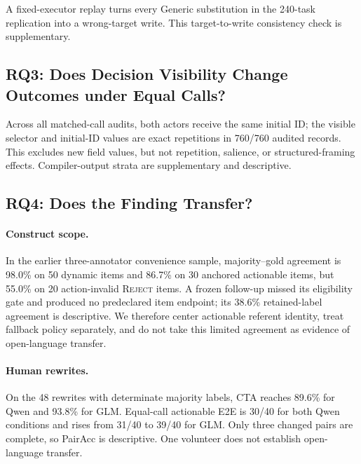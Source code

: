 \documentclass[letterpaper]{article}
\begin{document}
A fixed-executor replay turns every Generic substitution in the 240-task replication into a
wrong-target write. This target-to-write consistency check is supplementary.

\subsection{RQ3: Does Decision Visibility Change Outcomes under Equal Calls?}
%

Across all matched-call audits, both actors receive the same initial ID; the visible selector and
initial-ID values are exact repetitions in 760/760 audited records. This excludes new field values,
but not repetition, salience, or structured-framing effects. Compiler-output strata are
supplementary and descriptive.

\subsection{RQ4: Does the Finding Transfer?}

\paragraph{Construct scope.}
In the earlier three-annotator convenience sample, majority--gold agreement is 98.0\% on 50 dynamic
items and 86.7\% on 30 anchored actionable items, but 55.0\% on 20 action-invalid \textsc{Reject}
items. A frozen follow-up missed its eligibility gate and produced no predeclared item endpoint;
its 38.6\% retained-label agreement is descriptive. We therefore center actionable referent
identity, treat fallback policy separately, and do not take this limited agreement as evidence of
open-language transfer.

\paragraph{Human rewrites.}
On the 48 rewrites with determinate majority labels, CTA reaches 89.6\% for Qwen and 93.8\% for GLM.
Equal-call actionable E2E is 30/40 for both Qwen conditions and rises from 31/40 to 39/40 for GLM.
Only three changed pairs are complete, so PairAcc is descriptive. One volunteer does not establish
open-language transfer.
\end{document}
